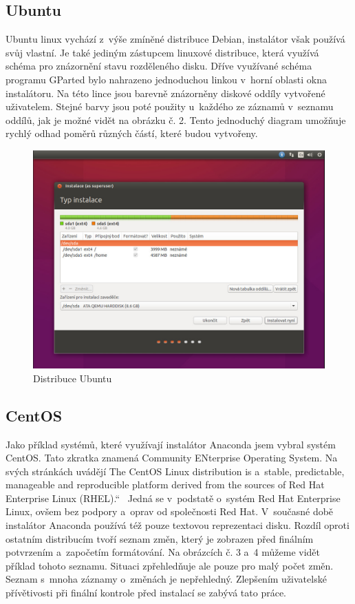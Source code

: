 \documentclass[a4paper,twosided]{article}
\newcommand{\uv}[1]{\quotedblbase #1\textquotedblleft}
\begin{document}
\subsection{Ubuntu}

Ubuntu linux vychází z~výše zmíněné distribuce Debian, instalátor však používá svůj vlastní. Je také jediným zástupcem linuxové distribuce, která využívá  schéma 
pro znázornění stavu rozděleného disku. Dříve využívané schéma programu GParted bylo nahrazeno jednoduchou linkou v~horní oblasti okna instalátoru. Na této lince jsou barevně znázorněny diskové 
oddíly vytvořené uživatelem. Stejné barvy jsou poté použity u~každého ze záznamů v~seznamu oddílů, jak je možné vidět na obrázku č. 2. Tento jednoduchý diagram umožňuje rychlý odhad poměrů různých 
částí, které budou vytvořeny.

\begin{figure}[b]
\label{fig:ubuntu}
\caption{Distribuce Ubuntu}
\centering
\includegraphics[width=.8\columnwidth]{pics/ubuntu1.jpg}
\end{figure}

\subsection{CentOS}

Jako příklad systémů, které využívají instalátor Anaconda jsem vybral systém CentOS. Tato zkratka znamená Community ENterprise Operating System. Na svých stránkách uvádějí \uv{The CentOS Linux
distribution is a~stable, predictable, manageable and reproducible platform derived from the sources of Red Hat Enterprise Linux (RHEL).}~\cite{CentOS} Jedná se v~podstatě o~systém Red Hat Enterprise 
Linux, ovšem bez podpory a~oprav od společnosti Red Hat. V~současné době instalátor Anaconda používá též pouze textovou reprezentaci disku. Rozdíl oproti ostatním distribucím tvoří 
seznam změn, který je zobrazen před finálním potvrzením a~započetím formátování. Na obrázcích č. 3 a~4 můžeme vidět příklad tohoto seznamu. Situaci zpřehledňuje ale pouze pro malý počet změn. Seznam s~mnoha 
záznamy o~změnách je nepřehledný. Zlepšením uživatelské přívětivosti při finální kontrole před instalací se zabývá tato práce.
\end{document}
